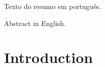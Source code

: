 \documentclass[a4paper,12pt,oneside,onecolumn,final,fleqn]{config/repUERJ}
\begin{document}
%

Texto do resumo em português.\\

\imprimirchaves%

%

Abstract in English.\\

\printkeys%
\listadefiguras%
\listadetabelas%



\sumario%
\mainmatter%
\chapter*{Introduction}%
\label{ch:intro}%

\end{document}
